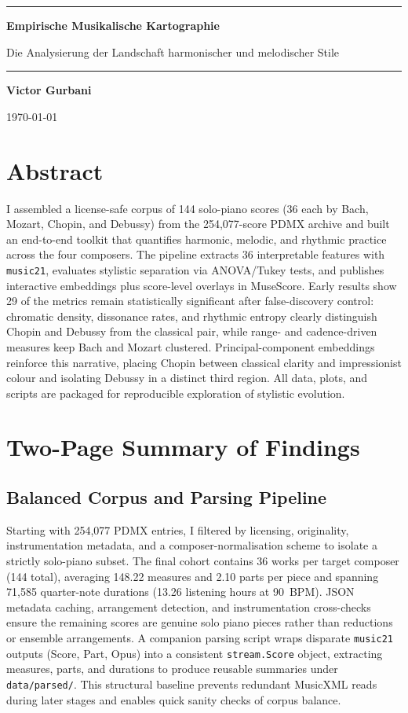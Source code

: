 \documentclass[12pt,a4paper]{article}
\theoremstyle{definition}
\renewcommand{\maketitle}{
    \begin{titlepage}
        \centering
        \vspace*{1cm}
        {\color{titlecolor}\rule{\linewidth}{1pt}}
        \vspace{1.5cm}
        
        {\fontsize{28}{34}\selectfont\color{titlecolor}\textbf{Empirische Musikalische Kartographie} \par Die Analysierung der Landschaft harmonischer und melodischer Stile\par}
        
        \vspace{1.5cm}
        {\color{titlecolor}\rule{\linewidth}{1pt}}
        \vspace{2cm}
        
        {\Large\textbf{Victor Gurbani}\par}
        \vspace{0.5cm}
        {\large\today\par}
        
        \vfill
    \end{titlepage}
}
\begin{document}
\maketitle
\setcounter{page}{1}
\newpage

\section{Abstract}
I assembled a license-safe corpus of 144 solo-piano scores (36 each by Bach, Mozart, Chopin, and Debussy) from the 254{,}077-score PDMX archive and built an end-to-end toolkit that quantifies harmonic, melodic, and rhythmic practice across the four composers. The pipeline extracts 36 interpretable features with \texttt{music21}, evaluates stylistic separation via ANOVA/Tukey tests, and publishes interactive embeddings plus score-level overlays in MuseScore. Early results show 29 of the metrics remain statistically significant after false-discovery control: chromatic density, dissonance rates, and rhythmic entropy clearly distinguish Chopin and Debussy from the classical pair, while range- and cadence-driven measures keep Bach and Mozart clustered. Principal-component embeddings reinforce this narrative, placing Chopin between classical clarity and impressionist colour and isolating Debussy in a distinct third region. All data, plots, and scripts are packaged for reproducible exploration of stylistic evolution.

\section{Two-Page Summary of Findings}

\subsection{Balanced Corpus and Parsing Pipeline}
Starting with 254{,}077 PDMX entries, I filtered by licensing, originality, instrumentation metadata, and a composer-normalisation scheme to isolate a strictly solo-piano subset. The final cohort contains 36 works per target composer (144 total), averaging 148.22 measures and 2.10 parts per piece and spanning 71{,}585 quarter-note durations (13.26 listening hours at 90~BPM). JSON metadata caching, arrangement detection, and instrumentation cross-checks ensure the remaining scores are genuine solo piano pieces rather than reductions or ensemble arrangements. A companion parsing script wraps disparate \texttt{music21} outputs (Score, Part, Opus) into a consistent \texttt{stream.Score} object, extracting measures, parts, and durations to produce reusable summaries under \texttt{data/parsed/}. This structural baseline prevents redundant MusicXML reads during later stages and enables quick sanity checks of corpus balance.
\end{document}
